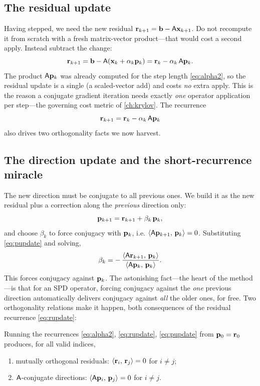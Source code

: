 \subsection{The residual update}
\label{sec:residual}

Having stepped, we need the new residual $\mathbf{r}_{k+1}=\mathbf{b}-\mathsf{A}\mathbf{x}_{k+1}$. Do not
recompute it from scratch with a fresh matrix-vector product---that would cost a
second apply. Instead subtract the change:
\[
  \mathbf{r}_{k+1} = \mathbf{b}-\mathsf{A}(\mathbf{x}_k+\alpha_k\mathbf{p}_k)
            = \mathbf{r}_k - \alpha_k\,\mathsf{A}\mathbf{p}_k .
\]
The product $\mathsf{A}\mathbf{p}_k$ was already computed for the step length
\eqref{eq:alpha2}, so the residual update is a single  (a
scaled-vector add) and costs \emph{no} extra apply. This is the reason a conjugate
gradient iteration needs exactly \emph{one} operator application per step---the
governing cost metric of \cref{ch:krylov}. The recurrence
\begin{equation}
\label{eq:rupdate}
  \mathbf{r}_{k+1} = \mathbf{r}_k - \alpha_k\,\mathsf{A}\mathbf{p}_k
\end{equation}
also drives two orthogonality facts we now harvest.

\subsection{The direction update and the short-recurrence miracle}
\label{sec:beta}

The new direction must be conjugate to all previous ones. We build it as the new
residual plus a correction along the \emph{previous} direction only:
\begin{equation}
\label{eq:pupdate}
  \mathbf{p}_{k+1} = \mathbf{r}_{k+1} + \beta_{k}\,\mathbf{p}_k ,
\end{equation}
and choose $\beta_k$ to force conjugacy with $\mathbf{p}_k$, i.e.
$\left\langle \mathsf{A}\mathbf{p}_{k+1},\, \mathbf{p}_k\right\rangle=0$. Substituting \eqref{eq:pupdate} and solving,
\[
  \beta_k = -\,\frac{\left\langle \mathsf{A}\mathbf{r}_{k+1},\, \mathbf{p}_k\right\rangle}{\left\langle \mathsf{A}\mathbf{p}_k,\, \mathbf{p}_k\right\rangle} .
\]
This forces conjugacy against $\mathbf{p}_k$. The astonishing fact---the heart of the
method---is that for an SPD operator, forcing conjugacy against the \emph{one}
previous direction automatically delivers conjugacy against \emph{all} the older
ones, for free. Two orthogonality relations make it happen, both consequences of
the residual recurrence \eqref{eq:rupdate}:

\begin{lemma}[CG orthogonalities]
\label{lem:orth}
Running the recurrences \eqref{eq:alpha2}, \eqref{eq:rupdate}, \eqref{eq:pupdate}
from $\mathbf{p}_0=\mathbf{r}_0$ produces, for all valid indices,
\begin{enumerate}[nosep, label=\textup{(\roman*)}]
  \item mutually orthogonal residuals: $\left\langle \mathbf{r}_i,\, \mathbf{r}_j\right\rangle=0$ for $i\neq j$;
  \item $\mathsf{A}$-conjugate directions: $\left\langle \mathsf{A}\mathbf{p}_i,\, \mathbf{p}_j\right\rangle=0$ for $i\neq j$.
\end{enumerate}
\end{lemma}

